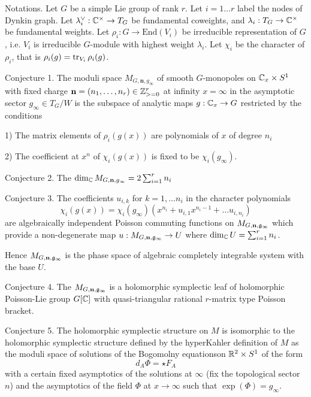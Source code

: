 \documentclass[12pt,psamsfonts,reqno]{amsart}
\begin{document}
Notations. Let $G$ be a simple Lie group of rank $r$. Let $i = 1 \dots r$ label the nodes of Dynkin graph. Let $\lambda_i^{\vee}: \mathbb C^{\times} \to T_{G}$ be fundamental coweights, and $\lambda_i:
T_{G} \to \mathbb C^{\times}$ be fundamental weights. Let $\rho_i: G \to \mathrm{End}(V_i)$
be irreducible representation of $G$, i.e.  $V_i$ is irreducible $G$-module with highest weight $\lambda_i$. Let $\chi_i$ be the character of $\rho_i$, that is $\rho_i(g) = \operatorname{tr}_{V_{i}} \rho_i(g)$. 





Conjecture 1. The moduli space $M_{G, \mathbf{n}, g_{\infty}}$ of smooth $G$-monopoles on $\mathbb C_{x} \times S^{1}$
with fixed charge $\mathbf{n} =(n_1, \dots, n_r) \in \mathbb Z_{>=0}^{r}$ at infinity $x =\infty$ 
in the asymptotic sector $g_\infty \in T_{G}/W$  is the subspace of analytic maps $g: \mathbb C_{x} \to G$ restricted by the conditions

1) The matrix elements of $\rho_i(g(x))$ are polynomials of $x$ of degree $n_i$

2) The coefficient at $x^n$ of $ \chi_{i}(g(x))$ is fixed to be $\chi_i(g_\infty)$.

\medskip

Conjecture 2. The $\dim_{\mathbb C} M_{G, \mathbf{n}, g_{\infty}} = 2 \sum_{i=1}^{r} n_i$

\medskip

Conjecture 3. The coefficients $u_{i,k}$ for $k=1, \dots n_i$ in the character polynomials
\begin{equation}
  \chi_i(g(x)) = \chi_i(g_{\infty})( x^{n_i} + u_{i,1} x^{n_i-1} + \dots u_{i,n_i})
\end{equation}
 are algebraically independent Poisson commuting functions on $M_{G, \mathbf{n}, \mathfrak{g}_{\infty}}$ which provide a non-degenerate map $u: M_{G, \mathbf{n}, \mathfrak{g}_{\infty}} \to U$
where $\dim_{\mathbb C} U =  \sum_{i=1}^{r} n_i$. 
  
 Hence $M_{G, \mathbf{n}, \mathfrak{g}_{\infty}}$ is the phase space of algebraic completely integrable system with the base $U$.

 \medskip


 Conjecture 4. The $M_{G, \mathbf{n}, \mathfrak{g}_{\infty}}$ is a holomorphic symplectic leaf of
 holomorphic Poisson-Lie group $G[\mathbb C]$ with quasi-triangular rational $r$-matrix type Poisson bracket.

\medskip
 
 Conjecture 5. The holomorphic symplectic structure on $M$ is isomorphic to the holomorphic symplectic
  structure defined by the hyperKahler definition of $M$ as the moduli space of solutions of the Bogomolny equationson $\mathbb R^2 \times S^1$ of the form
  \begin{equation}
     d_{A} \Phi = \star F_{A}
  \end{equation}
  with a certain fixed asymptotics of the solutions at $\infty$ (fix the topological sector $n$)
  and the asymptotics of the field $\Phi$ at $x \to \infty$ such that $\exp(\Phi) = g_{\infty}$. 
\end{document}
